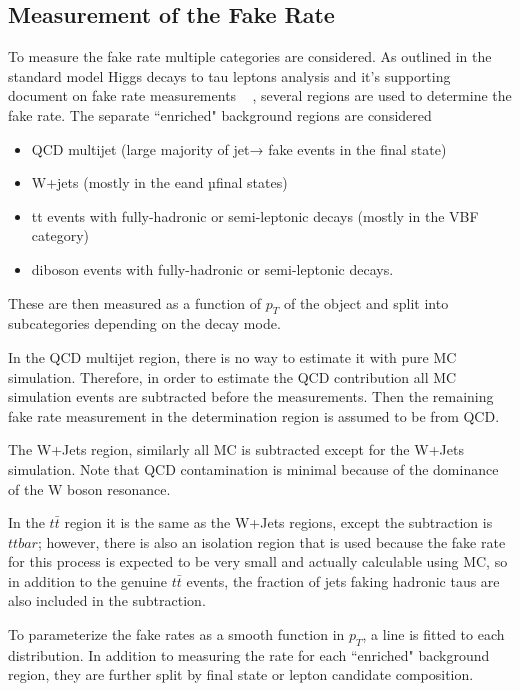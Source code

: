 \subsection{Measurement of the Fake Rate}
To measure the fake rate multiple categories are considered. As outlined in the standard model Higgs decays to tau leptons analysis and it's supporting document on fake rate measurements ~\cite{AN16355} , several regions are used to determine the fake rate. The separate ``enriched" background regions are considered 
\begin{itemize}
	\item QCD multijet (large majority of jet→ \tauh fake events in the \tauh \tauh final state)
	\item W+jets (mostly in the e\tauh and µ\tauh final states)
	\item tt events with fully-hadronic or semi-leptonic decays (mostly in the VBF category)
	\item diboson events with fully-hadronic or semi-leptonic decays.
\end{itemize} 

These are then measured as a function of $p_T$ of the object and split into subcategories depending on the decay mode.  

In the QCD multijet region, there is no way to estimate it with pure MC simulation. Therefore, in order to estimate the QCD contribution all MC simulation events are subtracted before the measurements. Then the remaining fake rate measurement in the determination region is assumed to be from QCD.

The W+Jets region, similarly all MC is subtracted except for the W+Jets simulation. Note that QCD contamination is minimal because of the dominance of the W boson resonance. 

In the $t\bar{t}$ region it is the same as the W+Jets regions, except the subtraction is $ttbar$; however, there is also an isolation region that is used because the fake rate for this process is expected to be very small and actually calculable using MC, so in addition to the genuine $t\bar{t}$ events, the fraction of jets faking hadronic taus are also included in the subtraction. 





To parameterize the fake rates as a smooth function in $p_T$, a line is fitted to each distribution. 
In addition to measuring the rate for each ``enriched" background region, they are further split by final state or lepton candidate composition. 

